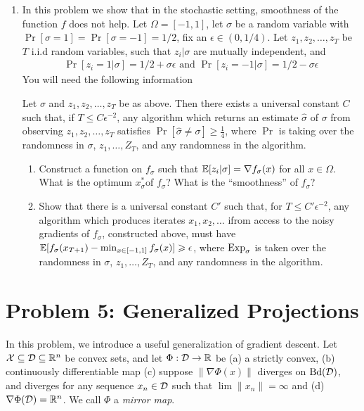 \documentclass[12pt]{article}
\begin{document}
\begin{enumerate}
\item 
In this problem we show that in the stochastic setting, smoothness of the function $f$ does not help. Let $\Omega = [-1,1]$, let $\sigma$ be a random variable with $\Pr[\sigma = 1] = \Pr[\sigma = -1] = 1/2$, fix an $\epsilon \in (0,1/4)$. Let $z_1,z_2,\dots,z_T$ be $T$ i.i.d random variables, such that $z_i | \sigma$ are mutually independent, and 
\begin{eqnarray}
\Pr[z_i =  1 | \sigma] = 1/2 + \sigma \epsilon \text{ and } \Pr[z_i =  -1 | \sigma] = 1/2 - \sigma \epsilon 
\end{eqnarray}
You will need the following information
\begin{lemma*} Let $\sigma$ and $z_1,z_2,\dots,z_T$ be as above. Then there exists a universal constant $C$ such that, if $T \le C \epsilon^{-2}$, any algorithm which returns an estimate $\widehat{\sigma}$ of $\sigma$ from observing $z_1,z_2,\dots,z_T$ satisfies $\Pr[\widehat{\sigma} \ne \sigma] \ge \frac{1}{4}$, where $\Pr$ is taking over the randomness in $\sigma$, $z_1,\dots,Z_T$, and any randomness in the algorithm. 
\end{lemma*}
\begin{enumerate}
\item
Construct a function on $f_{\sigma}$ such that $\operatorname*{\mathbb{E}}[z_i | \sigma] = \nabla f_{\sigma}(x)$ for all $x \in \Omega$. What is the optimum $x^*_{\sigma} $of $f_{\sigma}$? What is the ``smoothness'' of $f_{\sigma}$?
\item 
Show that there is a universal constant $C'$ such that, for $T \le C'\epsilon^{-2}$, any algorithm which produces iterates $x_1,x_2,\dots$ ifrom access to the noisy gradients of $f_{\sigma}$, constructed above, must have $\operatorname*{\mathbb{E}}[f_{\sigma}(x_{T+1}) - \min_{x \in [-1,1]}f_{\sigma}(x)] \geqslant \epsilon$, where $\mathrm{Exp}_{\sigma}$ is taken over the randomness in $\sigma$, $z_1,\dots,Z_T$, and any randomness in the algorithm.  
\end{enumerate}
\end{enumerate}
\section*{Problem 5: Generalized Projections}

In this problem, we introduce a useful generalization of gradient descent. Let
${\cal X} \subseteq {\cal D} \subseteq \mathbb{R}^n$ be convex sets, and let $\Phi: {\cal D} \to \mathbb{R}$ be (a)
a strictly convex, (b) continuously differentiable map (c) suppose $\|\nabla
\Phi(x)\|$ diverges on $\mathrm{Bd}({\cal D})$, and diverges for any sequence $x_n \in {\cal D}$ such that $\lim \|x_n\| = \infty$ and (d) $\nabla \Phi({\cal D}) = \mathbb{R}^n$. We call $\Phi$ a \emph{mirror map}.
\end{document}
